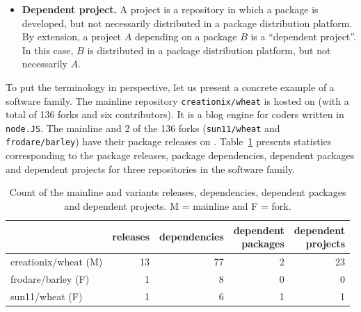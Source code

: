 \begin{itemize}
      \item \textbf{Dependent project.} A project is a repository in which a package is developed, but not necessarily distributed in a package distribution platform. By extension, a project $A$ depending on a package $B$ is a ``dependent project''. In this case, $B$ is distributed in a package distribution platform, but not necessarily $A$.
    
   

\end{itemize}

To put the terminology in perspective, let us present a concrete example of a software family. 
The mainline repository \texttt{creationix/wheat} is hosted on \gh (with a total of 136 forks and six contributors). It is a blog engine for coders written in \texttt{node.JS}. 
The mainline and 2 of the 136 forks (\texttt{sun11/wheat} and \texttt{frodare/barley}) have their package releases on \npm.
Table~\ref{tab:example} presents statistics corresponding to the package releases, package dependencies, dependent packages and dependent projects for three repositories in the software family.

\begin{table}[ht]
\begin{center}
\caption{Count of the mainline and variants releases, dependencies, dependent packages and dependent projects. M = mainline and F = fork.}
\label{tab:example}
\begin{tabular}{l r r r r } 
 \hline
 &releases & dependencies & \shortstack{dependent \\ packages} & \shortstack{dependent \\ projects} \\ \hline
 creationix/wheat (M)  &13 & 77 & 2&23 \\ 
 frodare/barley (F)    &1 & 8 & 0 & 0 \\ 
 sun11/wheat (F)       &1 & 6 & 1 & 1 \\ 
 \hline
\end{tabular}
\end{center}
\end{table}

